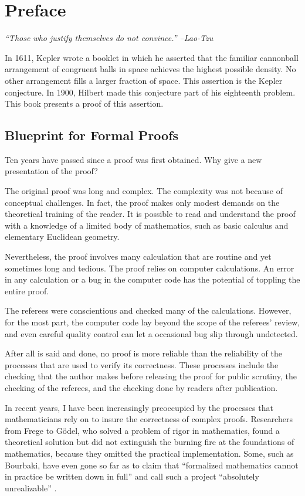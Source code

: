 
\chapter{Preface}

\centerline{\it ``Those who justify themselves do not convince.'' --Lao-Tzu}

In 1611, Kepler wrote a booklet in which he asserted that the familiar cannonball arrangement of congruent balls in space achieves the highest possible density.  No other arrangement fills a larger fraction of space.  This assertion is the Kepler conjecture.  In 1900, Hilbert made this conjecture part of his eighteenth problem.  This book presents a proof of this assertion.

\section{Blueprint for Formal Proofs}

Ten years have passed since a proof was first
obtained. Why give a new presentation of the proof?

The original proof was long and complex.  The complexity was not
because of conceptual challenges.  In fact, the proof makes only
modest demands on the theoretical training of the reader.  It is
possible to read and understand the proof with a knowledge of a
limited body of mathematics, such as basic calculus and elementary
Euclidean geometry.

Nevertheless, the proof involves many  calculation that are routine
and yet sometimes long and tedious.  The proof relies on computer calculations.  An error in any calculation or a bug in the
computer code has the potential of toppling the entire proof.

The referees were conscientious and checked many of the
calculations.  However, for the most part, the computer code lay beyond the scope of the referees' review, and even careful quality control can let a occasional bug slip through undetected.


After all is said and done, no proof is more reliable than the
reliability of the processes that are used to verify its
correctness.  These processes include the checking that the author
makes before releasing the proof for public scrutiny, the checking
of the referees, and the checking done by readers after publication.

In recent years, I have been increasingly preoccupied by the
processes that mathematicians rely on to insure the correctness of complex
proofs. Researchers from Frege to G\"odel, who solved a problem of
rigor in mathematics, found a theoretical solution but did not
extinguish the burning fire at the foundations of mathematics,
because they omitted the practical implementation. Some, such as
Bourbaki, have even gone so far as to claim that ``formalized
mathematics cannot in practice be written down in full'' and call
such a project
``absolutely unrealizable'' \cite[p 10,11]{Bour:68:Sets}. %

